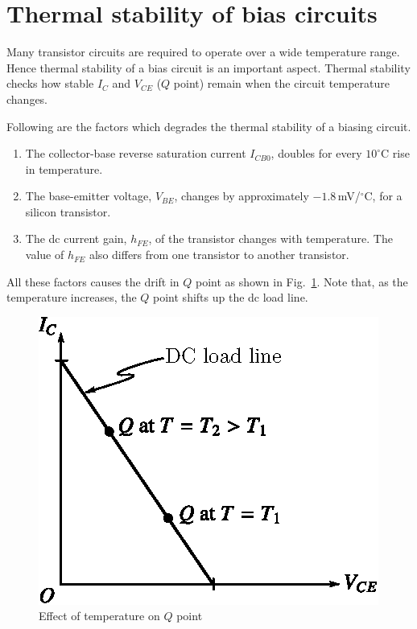 \eject

\section{Thermal stability of bias circuits}\label{sec4.10}

Many transistor circuits are required to operate over a wide temperature range. Hence thermal stability of a bias circuit is an important aspect. Thermal stability checks how stable $I_{C}$ and $V_{CE}$ ($Q$ point) remain when the circuit temperature changes.

Following are the factors which degrades the thermal stability of a biasing circuit.
\begin{enumerate}
\item The collector-base reverse saturation current $I_{CB0}$, doubles for every $10^{\circ}$C rise in temperature.

\item The base-emitter voltage, $V_{BE}$, changes by approximately $-1.8$\,mV/$^{\circ}$C, for a silicon transistor.

\item The dc current gain, $h_{FE}$, of the transistor changes with temperature. The value of $h_{FE}$ also differs from one transistor to another transistor.
\end{enumerate}

All these factors causes the drift in $Q$ point as shown in Fig.~\ref{fig4.18}. Note that, as the temperature increases, the $Q$ point shifts up the dc load line.
\begin{figure}[H]
\centering
\includegraphics{chap3/fig3.18.eps}
\caption{Effect of temperature on $Q$ point}\label{fig4.18}
\end{figure}

